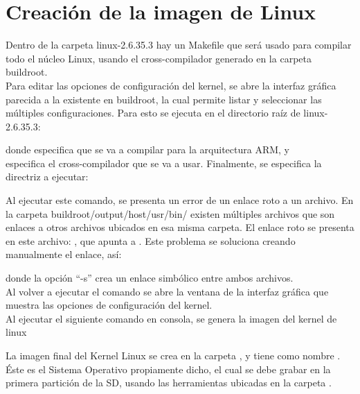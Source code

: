 \documentclass[12pt]{article}
\begin{document}
\section{Creación de la imagen de Linux}
\noindent 
Dentro de la carpeta linux-2.6.35.3 hay un Makefile que será usado para compilar todo el núcleo Linux, usando el cross-compilador generado en la carpeta buildroot.\\
Para editar las opciones de configuración del kernel, se abre la interfaz gráfica parecida a la existente en buildroot, la cual permite listar y seleccionar las múltiples configuraciones. Para esto se ejecuta en el directorio raíz de linux-2.6.35.3:
\begin{center}
\end{center}
\noindent
donde  especifica que se va a compilar para la arquitectura ARM, y\\
 especifica el cross-compilador que se va a usar. Finalmente, se especifica la directriz a ejecutar:
\begin{center}
\end{center}
\noindent
Al ejecutar este comando, se presenta un error de un enlace roto a un archivo. En la carpeta buildroot/output/host/usr/bin/ existen múltiples archivos que son enlaces a otros archivos ubicados en esa misma carpeta. El enlace roto se presenta en este archivo: , que apunta a . Este problema se soluciona creando manualmente el enlace, así:
\begin{center}
\end{center}
\noindent
donde la opción ``-s'' crea un enlace simbólico entre ambos archivos.\\
Al volver a ejecutar el comando  se abre la ventana de la interfaz gráfica que muestra las opciones de configuración del kernel.\\
Al ejecutar el siguiente comando en consola, se genera la imagen del kernel de linux
\begin{center}
\end{center}
\noindent
La imagen final del Kernel Linux se crea en la carpeta , y tiene como nombre . Éste es el Sistema Operativo propiamente dicho, el cual se debe grabar en la primera partición de la SD, usando las herramientas ubicadas en la carpeta .
\end{document}
